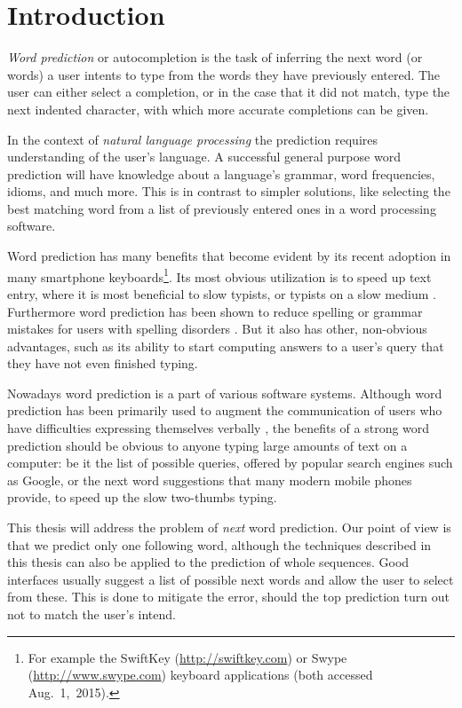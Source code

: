 \chapter{Introduction}
\label{ch:introduction}

\emph{Word prediction} or autocompletion is the task of inferring the next
word (or words) a user intents to type from the words they have previously
entered.
The user can either select a completion, or in the case that it did not
match, type the next indented character, with which more accurate completions
can be given.

In the context of \emph{natural language processing} the prediction requires
understanding of the user's language.
A successful general purpose word prediction will have knowledge about a
language's grammar, word frequencies, idioms, and much more.
This is in contrast to simpler solutions, like selecting the best matching word
from a list of previously entered ones in a word processing software.

Word prediction has many benefits that become evident by its recent adoption
in many smartphone keyboards\footnote{For example the SwiftKey
(\url{http://swiftkey.com}) or Swype (\url{http://www.swype.com}) keyboard
applications (both accessed Aug.~1,~2015).}.
Its most obvious utilization is to speed up text entry, where it is most
beneficial to slow typists, or typists on a slow medium \parencite{Trnka2007}.
Furthermore word prediction has been shown to reduce spelling or grammar
mistakes for users with spelling disorders \parencite{Newell1992}.
But it also has other, non-obvious advantages, such as its ability to start
computing answers to a user's query that they have not even finished
typing\noref.

Nowadays word prediction is a part of various software systems.
Although word prediction has been primarily used to augment the communication of
users who have difficulties expressing themselves verbally
\parencite{Swiffin1987,Trnka2011}, the benefits of a strong word prediction
should be obvious to anyone typing large amounts of text on a computer:
be it the list of possible queries, offered by popular search engines such as
Google, or the next word suggestions that many modern mobile phones provide, to
speed up the slow two-thumbs typing.

This thesis will address the problem of \emph{next} word prediction.
Our point of view is that we predict only one following word, although the
techniques described in this thesis can also be applied to the prediction
of whole sequences.
Good interfaces usually suggest a list of possible next words and allow the
user to select from these.
This is done to mitigate the error, should the top prediction turn out not to
match the user's intend.

